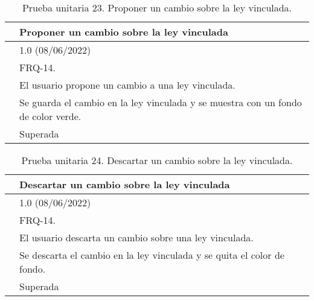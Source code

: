 \begin{table}[H]
\begin{center}
\begin{tabular}{|p{3cm}|p{10cm}|} \hline
\centering {\bf PU-23} & Proponer un cambio sobre la ley vinculada  \\ \hline\hline
\centering {\bf Versión} & 1.0 (08/06/2022) \\ \hline
\centering {\bf Dependencias} & FRQ-14. \\ \hline
\centering {\bf Descripción} &  El usuario propone un cambio a una ley vinculada. \\ \hline
\centering {\bf Criterio de aceptación} & Se guarda el cambio en la ley vinculada y se muestra con un fondo de color verde. \\ \hline
\centering {\bf Estado} & Superada \\ \hline
\end{tabular}
\caption{Prueba unitaria 23. Proponer un cambio sobre la ley vinculada.}
\label{enlacePU23}
\end{center}
\end{table}

\begin{table}[H]
\begin{center}
\begin{tabular}{|p{3cm}|p{10cm}|} \hline
\centering {\bf PU-24} & Descartar un cambio sobre la ley vinculada  \\ \hline\hline
\centering {\bf Versión} & 1.0 (08/06/2022) \\ \hline
\centering {\bf Dependencias} & FRQ-14. \\ \hline
\centering {\bf Descripción} &  El usuario descarta un cambio sobre una ley vinculada. \\ \hline
\centering {\bf Criterio de aceptación} & Se descarta el cambio en la ley vinculada y se quita el color de fondo. \\ \hline
\centering {\bf Estado} & Superada \\ \hline
\end{tabular}
\caption{Prueba unitaria 24. Descartar un cambio sobre la ley vinculada.}
\label{enlacePU24}
\end{center}
\end{table}


